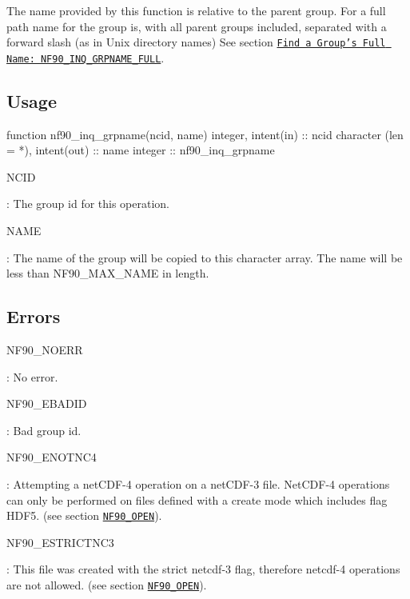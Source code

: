 The name provided by this function is relative to the parent group. For a full path name for the group is, with all parent groups included, separated with a forward slash (as in Unix directory names) See section \href{#f90-find-a-groups-full-name-nf90_inq_grpname_full}{\tt Find a Group’s Full Name\+: N\+F90\+\_\+\+I\+N\+Q\+\_\+\+G\+R\+P\+N\+A\+M\+E\+\_\+\+F\+U\+LL}.

\subsection*{Usage}


\begin{DoxyCode}
\textcolor{keyword}{function }nf90\_inq\_grpname(ncid, name)
  \textcolor{keywordtype}{integer}, \textcolor{keywordtype}{intent(in)} :: ncid
  \textcolor{keywordtype}{character (len = *)}, \textcolor{keywordtype}{intent(out)} :: name
  \textcolor{keywordtype}{integer} :: nf90\_inq\_grpname
\end{DoxyCode}


{\ttfamily N\+C\+ID}

\+: The group id for this operation.

{\ttfamily N\+A\+ME}

\+: The name of the group will be copied to this character array. The name will be less than N\+F90\+\_\+\+M\+A\+X\+\_\+\+N\+A\+ME in length.

\subsection*{Errors}

{\ttfamily N\+F90\+\_\+\+N\+O\+E\+RR}

\+: No error.

{\ttfamily N\+F90\+\_\+\+E\+B\+A\+D\+ID}

\+: Bad group id.

{\ttfamily N\+F90\+\_\+\+E\+N\+O\+T\+N\+C4}

\+: Attempting a net\+C\+D\+F-\/4 operation on a net\+C\+D\+F-\/3 file. Net\+C\+D\+F-\/4 operations can only be performed on files defined with a create mode which includes flag H\+D\+F5. (see section \href{#NF90_005fOPEN}{\tt N\+F90\+\_\+\+O\+P\+EN}).

{\ttfamily N\+F90\+\_\+\+E\+S\+T\+R\+I\+C\+T\+N\+C3}

\+: This file was created with the strict netcdf-\/3 flag, therefore netcdf-\/4 operations are not allowed. (see section \href{#NF90_005fOPEN}{\tt N\+F90\+\_\+\+O\+P\+EN}).

